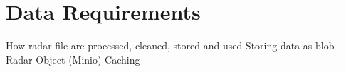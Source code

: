 \section{Data Requirements}

How radar file are processed, cleaned, stored and used
Storing data as blob - Radar Object (Minio)
Caching
